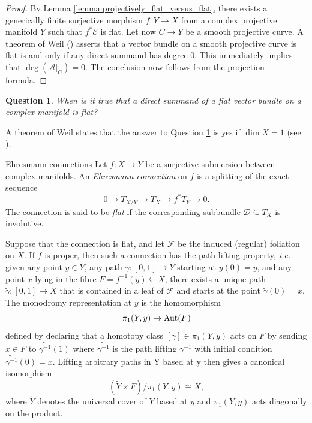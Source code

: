 \documentclass[english,10pt]{amsart}
\makeatletter
\renewcommand\subsection{\@startsection{subsection}{2}%
  \z@{.5\linespacing\@plus.7\linespacing}{-.5em}%
  {\normalfont\sffamily}}
\newcommand{\wt}{\widetilde}
\newcommand{\cF}{\mathcal{F}}
\newcommand{\sA}{\mathscr{A}}
\newcommand{\sD}{\mathscr{D}}
\newcommand{\sE}{\mathscr{E}}
\newtheorem{question}[thm]{Question}
\theoremstyle{definition}
\theoremstyle{remark}
\numberwithin{equation}{section}
\makeatother
\begin{document}
\begin{proof}
By Lemma \ref{lemma:projectively_flat_versus_flat}, there exists a generically finite surjective morphism $f \colon Y \to X$ from a complex projective manifold $Y$ such that $f^*\sE$ is flat. Let now $C \to Y$ be a smooth projective curve. A theorem of Weil (\cite[Theorem 10]{atiyah57}) asserts that a vector bundle on a smooth projective curve is flat is and only if any direct summand has degree $0$. This immediately implies that $\deg(\sA|_C)=0$. The conclusion now follows from the projection formula.   
\end{proof}

\begin{question}\label{question:direct_summand_1}
When is it true that a direct summand of a flat vector bundle on a complex manifold is flat?
\end{question}

A theorem of Weil states that the answer to Question \ref{question:direct_summand_1} is yes if $\dim X=1$ (see \cite[Theorem 10]{atiyah57}).

\subsection{Ehresmann connections} 
Let $f \colon X \to Y$ be a surjective submersion between complex manifolds. An \emph{Ehresmann connection} on $f$ is a splitting of the exact sequence
\[
0 \to T_{X/Y}\to T_X \to f^*T_Y \to 0.
\]
The connection is said to be \emph{flat} if the corresponding subbundle $\sD \subseteq T_X$ is involutive.

\medskip

Suppose that the connection is flat, and let $\cF$ be the induced (regular) foliation on $X$. If $f$ is proper, then such a connection has the path lifting property, \emph{i.e.} given any point $y \in Y$, any path $\gamma\colon [0,1] \to Y$ starting at $y(0) = y$, and any point $x$ lying in the fibre $F=f^{-1}(y) \subseteq X$, there exists a unique path $\tilde{\gamma} \colon [0,1] \to X$ that is contained in a leaf of $\cF$ and starts at the point $\tilde{\gamma}(0)=x$. The monodromy representation at $y$ is the homomorphism 
\[
\pi_1(Y,y) \to \textup{Aut}(F)
\] 
defined by declaring that a homotopy class $[\gamma] \in \pi_1(Y,y)$ acts on $F$ by sending $x \in F$ to $\widetilde{\gamma^{-1}}(1)$ where $\widetilde{\gamma^{-1}}$ is the path lifting $\gamma^{-1}$ with initial condition $\widetilde{\gamma^{-1}}(0)=x$. Lifting arbitrary paths in Y based at y then gives a canonical isomorphism
\[
(\wt{Y} \times F)/\pi_1(Y,y) \cong X,
\]
where $\wt{Y}$ denotes the universal cover of $Y$ based at $y$ and $\pi_1(Y,y)$ acts diagonally on the product.
\end{document}
